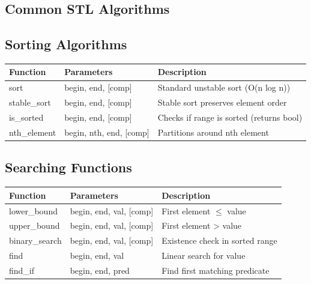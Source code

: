 \documentclass[10pt]{article}
\begin{document}
\begin{multicols*}{2}
\subsection{Common STL Algorithms}

\subsection*{Sorting Algorithms}
\begin{tabularx}{\linewidth}{|l|l|X|}
    \hline
    \textbf{Function} & \textbf{Parameters} & \textbf{Description} \\
    \hline
    sort & begin, end, [comp] & Standard unstable sort (O(n log n)) \\
    \hline
    stable\_sort & begin, end, [comp] & Stable sort preserves element order \\
    \hline
    is\_sorted & begin, end, [comp] & Checks if range is sorted (returns bool) \\
    \hline
    nth\_element & begin, nth, end, [comp] & Partitions around nth element \\
    \hline
\end{tabularx}

\subsection*{Searching Functions}
\begin{tabularx}{\linewidth}{|l|l|X|}
    \hline
    \textbf{Function} & \textbf{Parameters} & \textbf{Description} \\
    \hline
    lower\_bound & begin, end, val, [comp] & First element $\leq$ value \\
    \hline
    upper\_bound & begin, end, val, [comp] & First element > value \\
    \hline
    binary\_search & begin, end, val, [comp] & Existence check in sorted range \\
    \hline
    find & begin, end, val & Linear search for value \\
    \hline
    find\_if & begin, end, pred & Find first matching predicate \\
    \hline
\end{tabularx}


\end{multicols*}
\end{document}
